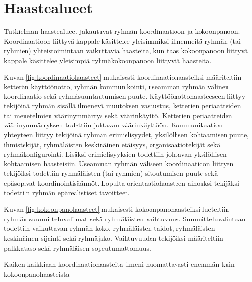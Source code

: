 \section{Haastealueet}

Tutkielman haastealueet jakautuvat ryhmän koordinaatioon ja kokoonpanoon. Koordinaatioon liittyvä kappale käsittelee yleisimmiksi ilmenneitä ryhmän (tai ryhmien) yhteistoimintaan vaikuttavia haasteita, kun taas kokoonpanoon liittyvä kappale käsittelee yleisimpiä ryhmäkokoonpanoon liittyviä haasteita. 

Kuvan \ref{fig:koordinaatiohaasteet} mukaisesti koordinaatiohaasteiksi määriteltiin ketterän käyttöönotto, ryhmän kommunikointi, useamman ryhmän välinen koordinaatio sekä ryhmäsuuntautumisen puute. Käyttöönottohaasteeseen liittyy tekijöinä ryhmän sisällä ilmenevä muutoksen vastustus, ketterien periaatteiden tai menetelmien väärinymmärrys sekä väärinkäyttö. Ketterien periaatteiden väärinymmärryksen todettiin johtavan väärinkäyttöön. Kommunikaation yhteyteen liittyy tekijöinä ryhmän erimielisyydet, yksilöllisen kohtaamisen puute, ihmistekijät, ryhmäläisten keskinäinen etäisyys, organisaatiotekijät sekä ryhmäkonfigurointi. Lisäksi erimielisyyksien todettiin johtavan yksilöllisen kohtaamisen haasteisiin. Useamman ryhmän väliseen koordinaatioon liittyen tekijöiksi todettiin ryhmäläisten (tai ryhmien) sitoutumisen puute sekä epäsopivat koordinointisäännöt. Lopulta orientaatiohaasteen ainoaksi tekijäksi todettiin ryhmän epärealistiset tavoitteet.

Kuvan \ref{fig:kokoonpanohaasteet} mukaisesti kokoonpanohaasteiksi lueteltiin ryhmän suunnitteluvalinnat sekä ryhmäläisten vaihtuvuus. Suunnitteluvalintaan todettiin vaikuttavan ryhmän koko, ryhmäläisten taidot, ryhmäläisten keskinäinen sijainti sekä ryhmäjako. Vaihtuvuuden tekijöiksi määriteltiin palkkataso sekä ryhmäläisen sopeutumattomuus. 

Kaiken kaikkiaan koordinaatiohaasteita ilmeni huomattavasti enemmän kuin kokoonpanohaasteista

